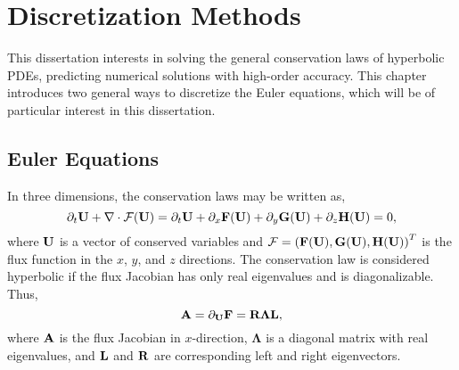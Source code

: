 \chapter{Discretization Methods}\label{chap:discrete_methods}

This dissertation interests in solving the general conservation laws of hyperbolic PDEs,
predicting numerical solutions with high-order accuracy.
This chapter introduces two general ways to discretize the Euler equations,
which will be of particular interest in this dissertation.

\section{Euler Equations}\label{sec:euler_eqns}

In three dimensions, the conservation laws may be written as,
\begin{equation}\label{eq:gov}
    \partial_{t} \mathbf{U} + \nabla \cdot \mathcal{F}(\mathbf{U})
    = \partial_{t} \mathbf{U} + \partial_{x} \mathbf{F} (\mathbf{U}) + \partial_{y} \mathbf{G} (\mathbf{U}) + \partial_{z} \mathbf{H} (\mathbf{U}) = 0,
\end{equation}
where \( \mathbf{U} \) is a vector of conserved variables and
\( \mathcal{F} = {(\mathbf{F} (\mathbf{U}), \mathbf{G} (\mathbf{U}), \mathbf{H} (\mathbf{U}))}^{T} \) is the flux function
in the \( x \), \( y \), and \( z \) directions.
The conservation law is considered hyperbolic
if the flux Jacobian has only real eigenvalues and is diagonalizable. Thus,
\begin{equation}\label{eq:hyperbolic}
    \mathbf{A} = \partial_{\mathbf{U}} \mathbf{F} = \mathbf{R} \mathbf{\Lambda} \mathbf{L},
\end{equation}
where \( \mathbf{A} \) is the flux Jacobian in \( x \)-direction,
\( \mathbf{\Lambda} \) is a diagonal matrix with real eigenvalues, and
\( \mathbf{L} \) and \( \mathbf{R} \) are corresponding left and right eigenvectors.

